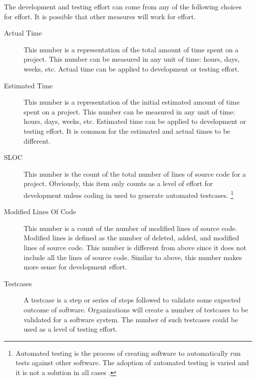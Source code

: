 \documentclass[SDSUThesis.tex]{subfiles}
\begin{document}
                The development and testing effort can come from any of 
                the following choices for effort. It is possible
                that other measures will work for effort.
                \begin{description}
                    \item[Actual Time] This number is a representation of the 
                        total amount of time spent on a project.  This number
                        can be measured in any unit of time: hours, days, weeks,
                        etc.  Actual time can be applied to development or testing
                        effort.
                    \item[Estimated Time] This number is a representation of the 
                        initial estimated amount of time spent on a project.  This number
                        can be measured in any unit of time: hours, days, weeks,
                        etc.  Estimated time can be applied to development or testing
                        effort.  It is common for the estimated and actual times
                        to be different.
                    \item[SLOC]  This number is the count of 
                        the total number of lines of source code for a project. 
                        Obviously, 
                        this item only counts as a level of
                        effort for development unless coding in used to generate
                        automated testcases. \footnote{Automated testing is the
                        process of creating software to automatically run tests
                        against other software.  The adoption of automated testing
                        is varied and it is not a solution in all cases 
                        \cite{Ramler2006}. }
                    \item[Modified Lines Of Code] This number is a count of the number 
                        of modified lines of source code. Modified lines is 
                        defined as the number of deleted, added, and modified 
                        lines of source code.  This number is different from above
                        since it does not include all the lines of source code.  Similar
                        to above, this number makes more sense for development effort.
                    \item[Testcases] A testcase is a step or series of steps followed
                        to validate some expected outcome of software.  Organizations
                        will create a number of testcases to be validated for a
                        software system.  The number of such testcases could
                        be used as a level of testing effort.
                \end{description}
                
\end{document}
